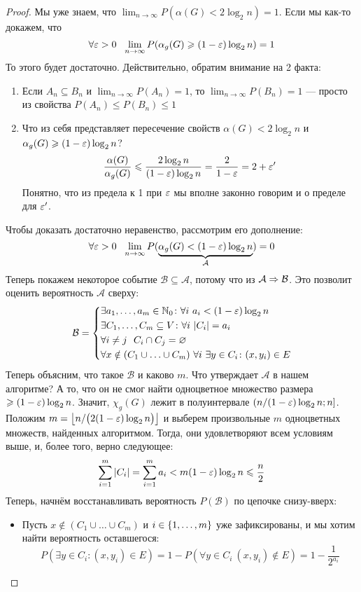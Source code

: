 \begin{proof}
	Мы уже знаем, что $\lim_{n \to \infty} P(\alpha(G) < 2\log_2 n) = 1$. Если мы как-то докажем, что
	\[
		\forall \varepsilon > 0\ \ \lim_{n \to \infty} P(\alpha_g(G) \geqslant (1 - \varepsilon)\log_2 n) = 1
	\]
	То этого будет достаточно. Действительно, обратим внимание на 2 факта:
	\begin{enumerate}
		\item Если $A_n \subseteq B_n$ и $\lim_{n \to \infty} P(A_n) = 1$, то $\lim_{n \to \infty} P(B_n) = 1$ --- просто из свойства $P(A_n) \le P(B_n) \le 1$
		
		\item Что из себя представляет пересечение свойств $\alpha(G) < 2\log_2 n$ и $\alpha_g(G) \geqslant (1 - \varepsilon)\log_2 n$?
		\[
			\frac{\alpha(G)}{\alpha_g(G)} \leqslant \frac{2\log_2 n}{(1 - \varepsilon)\log_2 n} = \frac{2}{1 - \varepsilon} = 2 + \varepsilon'
		\]
		Понятно, что из предела к 1 при $\varepsilon$ мы вполне законно говорим и о пределе для $\varepsilon'$.
	\end{enumerate}
	Чтобы доказать достаточно неравенство, рассмотрим его дополнение:
	\[
		\forall \varepsilon > 0\ \ \lim_{n \to \infty} P(\underbrace{\alpha_g(G) < (1 - \varepsilon)\log_2 n}_{\mathcal{A}}) = 0
	\]
	Теперь покажем некоторое событие $\mathcal{B} \subseteq \mathcal{A}$, потому что из $\mathcal{A} \Rightarrow \mathcal{B}$. Это позволит оценить вероятность $\mathcal{A}$ сверху:
	\[
		\mathcal{B} = \System{
			&{\exists a_1, \ldots, a_m \in \N_0 \colon \forall i\ a_i < (1 - \eps)\log_2 n}
			\\
			&{\exists C_1, \ldots, C_m \subseteq V \colon \forall i\ |C_i| = a_i}
			\\
			&{\forall i \neq j\ \ C_i \cap C_j = \emptyset}
			\\
			&{\forall x \notin (C_1 \cup \ldots \cup C_m)\ \forall i\ \exists y \in C_i \colon (x, y_i) \in E}
		}
	\]
	Теперь объясним, что такое $\mathcal{B}$ и каково $m$. Что утверждает $\mathcal{A}$ в нашем алгоритме? А то, что он не смог найти одноцветное множество размера $\geqslant (1 - \varepsilon)\log_2 n$. Значит, $\chi_g(G)$ лежит в полуинтервале $(n / (1 - \varepsilon)\log_2 n; n]$. Положим $m = \left\lfloor n / \big(2(1 - \varepsilon)\log_2 n\big) \right\rfloor$ и выберем произвольные $m$ одноцветных множеств, найденных алгоритмом. Тогда, они удовлетворяют всем условиям выше, и, более того, верно следующее:
	\[
		\sum_{i = 1}^m |C_i| = \sum_{i = 1}^m a_i < m (1 - \varepsilon)\log_2 n \leqslant \frac{n}{2}
	\]
	Теперь, начнём восстанавливать вероятность $P(\mathcal{B})$ по цепочке снизу-вверх:
	\begin{itemize}
		\item Пусть $x \notin (C_1 \cup \ldots \cup C_m)$ и $i \in \{1, \ldots, m\}$ уже зафиксированы, и мы хотим найти вероятность оставшегося:
		\[
			P(\exists y \in C_i \colon (x, y_i) \in E) = 1 - P(\forall y \in C_i\ (x, y_i) \notin E) = 1 - \frac{1}{2^{a_i}}
		\]
		

\end{itemize}
\end{proof}
